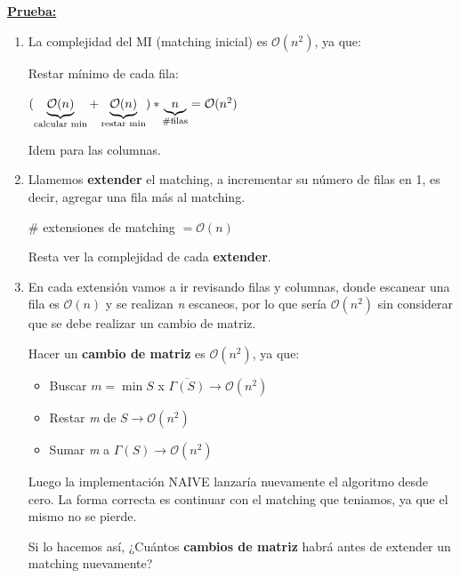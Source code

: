 \documentclass[12pt,a4paper]{report}
\begin{document}
		\textbf{\underline{Prueba:}}
			\begin{enumerate}
				\item La complejidad del MI (matching inicial) es $\mathcal{O}(n^{2})$, ya que:
					\par Restar mínimo de cada fila:
					\begin{center}
						$(\underbrace{\mathcal{O}(n)}_{\textup{calcular min}} + \underbrace{\mathcal{O}(n)}_{\textup{restar min}}) * \underbrace{n}_{\# \textup{filas}} = \mathcal{O}(n^{2})$
					\end{center}
					\par Idem para las columnas.
				\item Llamemos \textbf{extender} el matching, a incrementar su número de filas en 1, es decir, agregar una fila más al matching.
					\begin{center}
						$\#$ extensiones de matching $= \mathcal{O}(n)$
					\end{center}

				\par Resta ver la complejidad de cada \textbf{extender}.
				\item En cada extensión vamos a ir revisando filas y columnas, donde escanear una fila es $\mathcal{O}(n)$ y se realizan \textit{n} escaneos, por lo que sería $\mathcal{O}(n^{2})$ sin considerar que se debe realizar un cambio de matriz.
					\par Hacer un \textbf{cambio de matriz} es $\mathcal{O}(n^{2})$, ya que:
					\begin{itemize}
						\item Buscar $\textit{m} = \min S$ x $\overline{\Gamma(S)} \rightarrow \mathcal{O}(n^{2})$
						\item Restar \textit{m} de $S \rightarrow \mathcal{O}(n^{2})$
						\item Sumar \textit{m} a $\Gamma(S) \rightarrow \mathcal{O}(n^{2})$
					\end{itemize}

					\par Luego la implementación NAIVE lanzaría nuevamente el algoritmo desde cero. La forma correcta es continuar con el matching que teniamos, ya que el mismo no se pierde.
					\par Si lo hacemos así, ¿Cuántos \textbf{cambios de matriz} habrá antes de extender un matching nuevamente?


\end{enumerate}
\end{document}
